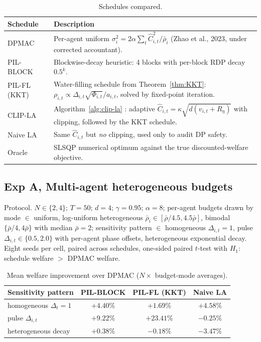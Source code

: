 \documentclass{article}
\begin{document}
\begin{table}[t]
\centering
\caption{Schedules compared.}
\label{tab:schedules_compared}
\renewcommand{\arraystretch}{1.15}
\small
\begin{tabular}{p{2.2cm} p{7.0cm}}
\hline
\textbf{Schedule} & \textbf{Description} \\
\hline
DPMAC & Per-agent uniform $\sigma_i^2 = 2\alpha \sum_t \hat C_{i,t}^2 / \bar{\rho}_i$ (Zhao et al., 2023, under corrected accountant). \\
PIL-BLOCK & Blockwise-decay heuristic: 4 blocks with per-block RDP decay $0.5^k$. \\
PIL-FL (KKT) & Water-filling schedule from Theorem~\ref{thm:KKT}:
$\rho_{i,t} \propto \Delta_{i,t}\sqrt{\Phi_{i,t}}/a_{i,t}$, solved by fixed-point iteration. \\
CLIP-LA & Algorithm~\ref{alg:clip-la} : adaptive $\hat C_{i,t} = \kappa\sqrt{d(v_{i,t}+R_\eta)}$ with clipping, followed by the KKT schedule. \\
Naive LA & Same $\hat C_{i,t}$ but \emph{no} clipping, used only to audit DP safety. \\
Oracle & SLSQP numerical optimum against the true discounted-welfare objective. \\
\hline
\end{tabular}
\end{table}

\subsection{Exp A, Multi-agent heterogeneous budgets}

Protocol. $N \in \{2, 4\}$; $T = 50$; $d = 4$; $\gamma = 0.95$; $\alpha = 8$; per-agent budgets drawn by mode $\in$ {uniform, log-uniform heterogeneous $\bar\rho_i \in [\bar\rho/4.5, 4.5\bar\rho]$, bimodal $\{\bar\rho/4, 4\bar\rho\}$} with median $\bar\rho = 2$; sensitivity pattern $\in$ {homogeneous $\Delta_{i,t} = 1$, pulse $\Delta_{i,t} \in \{0.5, 2.0\}$ with per-agent phase offsets, heterogeneous exponential decay}. Eight seeds per cell, paired across schedules, one-sided paired $t$-test with $H_1$: schedule welfare $>$ DPMAC welfare.

\begin{table}[h!]
\centering
\caption{Mean welfare improvement over DPMAC ($N \times$ budget-mode averages).}
\label{tab:welfare_improvement}
\renewcommand{\arraystretch}{1.15}
\begin{tabular}{lccc}
\hline
\textbf{Sensitivity pattern} & \textbf{PIL-BLOCK} & \textbf{PIL-FL (KKT)} & \textbf{Naive LA} \\
\hline
homogeneous $\Delta_t = 1$ & $+4.40\%$ & $+1.69\%$ & $+4.58\%$ \\
pulse $\Delta_{i,t}$ & $+9.22\%$ & $+23.41\%$ & $-0.25\%$ \\
heterogeneous decay & $+0.38\%$ & $-0.18\%$ & $-3.47\%$ \\
\hline
\end{tabular}
\end{table}
\end{document}
